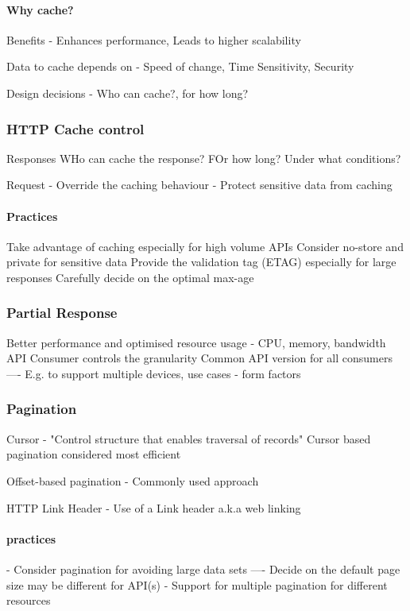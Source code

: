 \documentclass[a4paper, 11pt]{book}
\begin{document}
    \paragraph{Why cache?}
    Benefits - Enhances performance, Leads to higher scalability

    Data to cache depends on - Speed of change, Time Sensitivity, Security

    Design decisions - Who can cache?, for how long?

    \subsubsection{HTTP Cache control}
    Responses
    WHo can cache the response?
    FOr how long?
    Under what conditions?

    Request
    - Override the caching behaviour
    - Protect sensitive data from caching

    \paragraph{Practices}
    Take advantage of caching especially for high volume APIs
    Consider no-store and private for sensitive data
    Provide the validation tag (ETAG) especially for large responses
    Carefully decide on the optimal max-age

    \subsubsection{Partial Response}
    Better performance and optimised resource usage - CPU, memory, bandwidth
    API Consumer controls the granularity
    Common API version for all consumers
    ---- E.g. to support multiple devices, use cases - form factors

    \subsubsection{Pagination}
    Cursor - "Control structure that enables traversal of records"
    Cursor based pagination considered most efficient

    Offset-based pagination - Commonly used approach %

    HTTP Link Header - Use of a Link header a.k.a web linking

    \paragraph{practices}
    - Consider pagination for avoiding large data sets
    ---- Decide on the default page size may be different for API(s)
    - Support for multiple pagination for different resources
\end{document}
